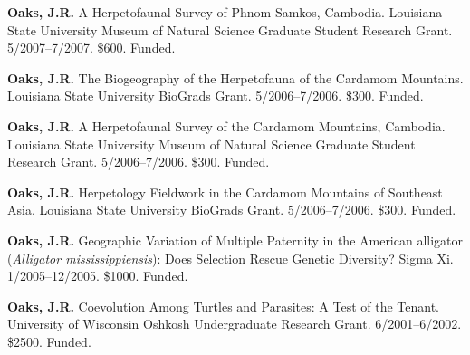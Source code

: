 {\myHangIndent
\textbf{Oaks, J.R.}
A Herpetofaunal Survey of Phnom Samkos, Cambodia.
Louisiana State University Museum of Natural Science Graduate Student Research
Grant.
5/2007--7/2007.
\$600.
Funded.

\myHangIndent
\textbf{Oaks, J.R.}
The Biogeography of the Herpetofauna of the Cardamom Mountains.
Louisiana State University BioGrads Grant.
5/2006--7/2006.
\$300.
Funded.

\myHangIndent
\textbf{Oaks, J.R.}
A Herpetofaunal Survey of the Cardamom Mountains, Cambodia.
Louisiana State University Museum of Natural Science Graduate Student Research
Grant.
5/2006--7/2006.
\$300.
Funded.

\myHangIndent
\textbf{Oaks, J.R.}
Herpetology Fieldwork in the Cardamom Mountains of Southeast Asia.
Louisiana State University BioGrads Grant.
5/2006--7/2006.
\$300.
Funded.

\myHangIndent
\textbf{Oaks, J.R.}
Geographic Variation of Multiple Paternity in the American alligator
(\emph{Alligator mississippiensis}): Does Selection Rescue Genetic Diversity?
Sigma Xi.
1/2005--12/2005.
\$1000.
Funded.

\myHangIndent
\textbf{Oaks, J.R.}
Coevolution Among Turtles and Parasites: A Test of the Tenant.
University of Wisconsin Oshkosh Undergraduate Research Grant.
6/2001--6/2002.
\$2500.
Funded.
}
